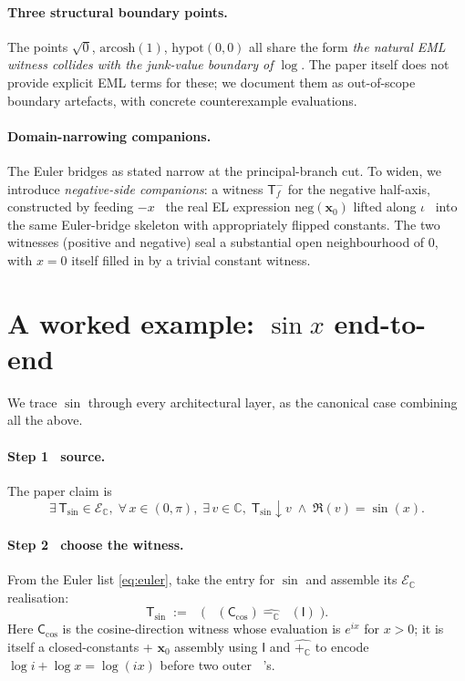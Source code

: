 \documentclass[11pt]{article}
\newcommand{\hexpC}{\mathop{\widehat{\exp_{\!\mathbb{C}}}}}
\newcommand{\hlogC}{\mathop{\widehat{\log_{\!\mathbb{C}}}}}
\newcommand{\haddC}{\mathbin{\widehat{+_{\!\mathbb{C}}}}}
\newcommand{\hsubC}{\mathbin{\widehat{-_{\!\mathbb{C}}}}}
\newcommand{\EsetC}{\mathcal{E}_{\mathbb{C}}}
\theoremstyle{plain}
\theoremstyle{definition}
\begin{document}
\paragraph{Three structural boundary points.}
The points $\sqrt{0}$, $\mathrm{arcosh}(1)$, $\mathrm{hypot}(0, 0)$ all
share the form \emph{the natural EML witness collides with the
junk-value boundary of $\log$}. The paper itself does not provide
explicit EML terms for these; we document them as out-of-scope
boundary artefacts, with concrete counterexample evaluations.

\paragraph{Domain-narrowing companions.}
The Euler bridges as stated narrow at the principal-branch cut. To
widen, we introduce \emph{negative-side companions}: a witness
$\mathsf{T}_f^{-}$ for the negative half-axis, constructed by feeding
$-x$ \textemdash\ the real EL expression $\mathrm{neg}(\mathbf{x}_0)$
lifted along $\iota$ \textemdash\ into the same Euler-bridge skeleton with
appropriately flipped constants. The two witnesses (positive and
negative) seal a substantial open neighbourhood of $0$, with $x = 0$
itself filled in by a trivial constant witness.

\section{A worked example: \texorpdfstring{$\sin x$}{sin x} end-to-end}

We trace $\sin$ through every architectural layer, as the canonical
case combining all the above.

\paragraph{Step 1 \textemdash\ source.} The paper claim is
\[
  \exists\,\mathsf{T}_{\sin} \in \EsetC,\;
  \forall\, x \in (0, \pi),\;
  \exists\, v \in \mathbb{C},\;
  \mathsf{T}_{\sin} \downarrow v
  \;\wedge\; \Re(v) = \sin(x).
\]

\paragraph{Step 2 \textemdash\ choose the witness.} From the Euler list
\eqref{eq:euler}, take the entry for $\sin$ and assemble its
$\EsetC$ realisation:
\[
  \boxed{\;\;\mathsf{T}_{\sin} \;:=\;
    \hexpC\!\bigl(\;
      \hlogC(\mathsf{C}_{\cos}) \;\hsubC\; \hlogC(\mathsf{I})
    \;\bigr).\;\;}
\]
Here $\mathsf{C}_{\cos}$ is the cosine-direction witness whose
evaluation is $e^{ix}$ for $x > 0$; it is itself a closed-constants +
$\mathbf{x}_0$ assembly using $\mathsf{I}$ and $\haddC$ to encode
$\log i + \log x = \log(ix)$ before two outer $\hexpC$'s.
\end{document}
